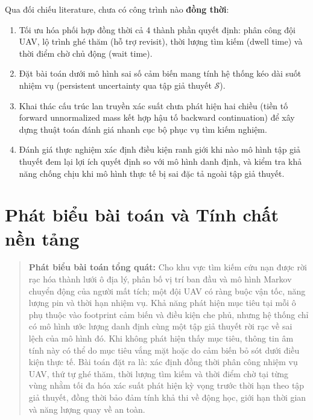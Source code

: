\documentclass[12pt,a4paper]{article}
\begin{document}
Qua đối chiếu literature, chưa có công trình nào \textbf{đồng thời}:
\begin{enumerate}[label=(\alph*)]
    \item Tối ưu hóa phối hợp đồng thời cả 4 thành phần quyết định: phân công đội UAV, lộ trình ghé thăm (hỗ trợ revisit), thời lượng tìm kiếm (dwell time) và thời điểm chờ chủ động (wait time).
    \item Đặt bài toán dưới mô hình sai số cảm biến mang tính hệ thống kéo dài suốt nhiệm vụ (persistent uncertainty qua tập giả thuyết $\mathcal{S}$).
    \item Khai thác cấu trúc lan truyền xác suất chưa phát hiện hai chiều (tiền tố forward unnormalized mass kết hợp hậu tố backward continuation) để xây dựng thuật toán đánh giá nhanh cục bộ phục vụ tìm kiếm nghiệm.
    \item Đánh giá thực nghiệm xác định điều kiện ranh giới khi nào mô hình tập giả thuyết đem lại lợi ích quyết định so với mô hình danh định, và kiểm tra khả năng chống chịu khi mô hình thực tế bị sai đặc tả ngoài tập giả thuyết.
\end{enumerate}

\section{Phát biểu bài toán và Tính chất nền tảng}

\begin{quote}
\textbf{Phát biểu bài toán tổng quát:} Cho khu vực tìm kiếm cứu nạn được rời rạc hóa thành lưới ô địa lý, phân bố vị trí ban đầu và mô hình Markov chuyển động của người mất tích; một đội UAV có ràng buộc vận tốc, năng lượng pin và thời hạn nhiệm vụ. Khả năng phát hiện mục tiêu tại mỗi ô phụ thuộc vào footprint cảm biến và điều kiện che phủ, nhưng hệ thống chỉ có mô hình ước lượng danh định cùng một tập giả thuyết rời rạc về sai lệch của mô hình đó. Khi không phát hiện thấy mục tiêu, thông tin âm tính này có thể do mục tiêu vắng mặt hoặc do cảm biến bỏ sót dưới điều kiện thực tế. Bài toán đặt ra là: xác định đồng thời phân công nhiệm vụ UAV, thứ tự ghé thăm, thời lượng tìm kiếm và thời điểm chờ tại từng vùng nhằm tối đa hóa xác suất phát hiện kỳ vọng trước thời hạn theo tập giả thuyết, đồng thời bảo đảm tính khả thi về động học, giới hạn thời gian và năng lượng quay về an toàn.
\end{quote}
\end{document}

